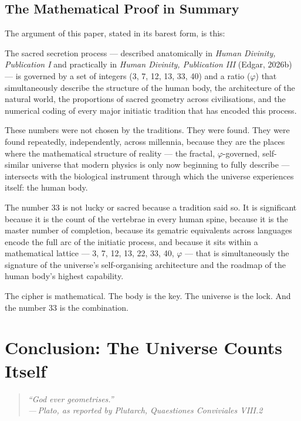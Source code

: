 \documentclass[12pt, a4paper]{article}
\newcommand{\epigraph}[2]{%
  \begin{quote}
    \itshape ``#1''\\[0.3em]
    \normalfont\small\hfill ---\,#2
  \end{quote}
}
\begin{document}
\subsection{The Mathematical Proof in Summary}

The argument of this paper, stated in its barest form, is this:

The sacred secretion process — described anatomically in \emph{Human Divinity,
Publication I} and practically in \emph{Human Divinity, Publication III}
(Edgar, 2026b) — is governed by
a set of integers (3, 7, 12, 13, 33, 40) and a ratio ($\varphi$) that
simultaneously describe the structure of the human body, the architecture of
the natural world, the proportions of sacred geometry across civilisations, and
the numerical coding of every major initiatic tradition that has encoded this
process.

These numbers were not chosen by the traditions. They were found. They were
found repeatedly, independently, across millennia, because they are the places
where the mathematical structure of reality — the fractal, $\varphi$-governed,
self-similar universe that modern physics is only now beginning to fully
describe — intersects with the biological instrument through which the universe
experiences itself: the human body.

The number 33 is not lucky or sacred because a tradition said so. It is
significant because it is the count of the vertebrae in every human spine,
because it is the master number of completion, because its gematric equivalents
across languages encode the full arc of the initiatic process, and because it
sits within a mathematical lattice — 3, 7, 12, 13, 22, 33, 40, $\varphi$ —
that is simultaneously the signature of the universe's self-organising
architecture and the roadmap of the human body's highest capability.

The cipher is mathematical. The body is the key. The universe is the lock.
And the number 33 is the combination.

\section{Conclusion: The Universe Counts Itself}
\label{sec:conclusion}

\epigraph{God ever geometrises.}{Plato, as reported by Plutarch,
\emph{Quaestiones Conviviales} VIII.2}
\end{document}
